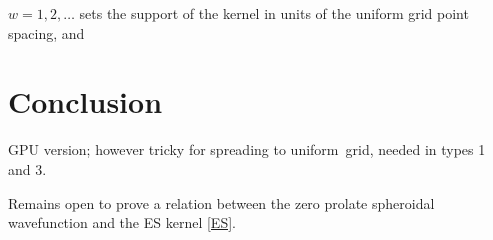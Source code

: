 \documentclass[10pt]{article}
\newcommand{\U}{{uniform}}
\begin{document}
$w=1,2,\ldots$
sets the support of the kernel in units of the uniform grid point spacing, and





\section{Conclusion}



GPU version; however tricky for spreading to \U\ grid, needed in types 1 and 3.


Remains open to prove a relation between the zero prolate spheroidal
wavefunction and the ES kernel \eqref{ES}.






\end{document}
